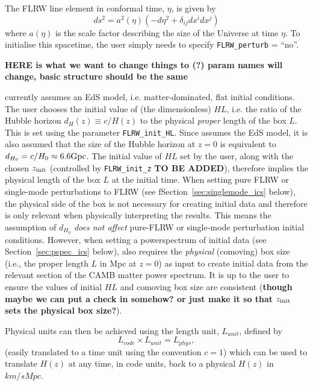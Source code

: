 The FLRW line element in conformal time, $\eta$, is given by
\begin{equation}
	ds^2 = a^2(\eta) \left( - d\eta^2 + \delta_{ij}dx^i dx^j \right)
\end{equation}
where $a(\eta)$ is the scale factor describing the size of the Universe at time $\eta$. To initialise this spacetime, the user simply needs to specify \texttt{FLRW\_perturb} = ``no''. 

\vspace{2mm}
{\bf HERE is what we want to change things to (?) param names will change, basic structure should be the same}
\vspace{2mm}

\flrwsolver currently assumes an EdS model, i.e. matter-dominated, flat initial conditions. The user chooses the initial value of (the dimensionless) $HL$, i.e. the ratio of the Hubble horizon $d_H(z)\equiv c/H(z)$ to the physical \emph{proper} length of the box $L$. This is set using the parameter \texttt{FLRW\_init\_HL}. Since \flrwsolver assumes the EdS model, it is also assumed that the size of the Hubble horizon at $z=0$ is equivalent to $d_{H_0}=c/H_0\approx 6.6{\rm Gpc}$. The initial value of $HL$ set by the user, along with the chosen $z_{\rm init}$ (controlled by \texttt{FLRW\_init\_z} {\bf TO BE ADDED}), therefore implies the physical length of the box $L$ at the initial time. When setting pure FLRW or single-mode perturbations to FLRW (see fSection~\ref{sec:singlemode_ics} below), the physical side of the box is not necessary for creating initial data and therefore is only relevant when physically interpreting the results. This means the assumption of $d_{H_0}$ \emph{does not affect} pure-FLRW or single-mode perturbation initial conditions. However, when setting a powerspectrum of initial data (see Section~\ref{sec:pspec_ics} below), \flrwsolver also requires the \emph{physical} (comoving) box size (i.e., the proper length $L$ in Mpc at $z=0$) as input to create initial data from the relevant section of the CAMB matter power spectrum. It is up to the user to ensure the values of initial $HL$ and comoving box size are consistent ({\bf though maybe we can put a check in somehow? or just make it so that $z_{\rm init}$ sets the physical box size?}).



Physical units can then be achieved using the length unit, $L_{unit}$, defined by
\begin{equation}
	L_{code} \times L_{unit} = L_{phys},
\end{equation}
(easily translated to a time unit using the convention $c=1$) which can be used to translate $H(z)$ at any time, in code units, back to a physical $H(z)$ in $km/s Mpc$. 

